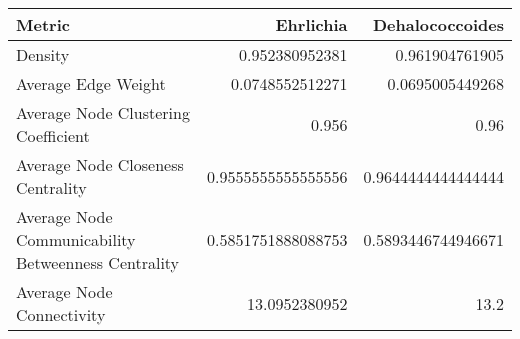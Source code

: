 \begin{center}
    \begin{tabular}{l|r r}
        Metric & Ehrlichia & Dehalococcoides\\
        \hline
        Density & 0.952380952381&0.961904761905\\
        Average Edge Weight & 0.0748552512271&0.0695005449268\\
        Average Node Clustering Coefficient & 0.956&0.96\\
        Average Node Closeness Centrality & 0.9555555555555556&0.9644444444444444\\
        Average Node Communicability Betweenness Centrality & 0.5851751888088753 &0.5893446744946671\\
        Average Node Connectivity & 13.0952380952 & 13.2\\
    \end{tabular}
\end{center}
